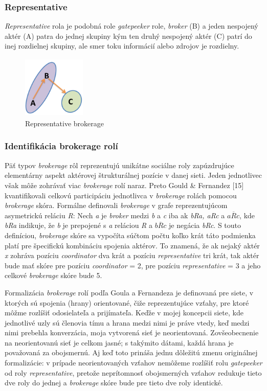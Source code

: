 \documentclass[slovak,master,public,dept460,male,cpdeclaration,oneside]{diploma}
\begin{document}
\subsubsection{Representative}
\textit{Representative} rola je podobná role \textit{gatepeeker} role, \textit{broker} (B) a jeden nespojený aktér (A) patra do jednej skupiny kým ten druhý nespojený aktér (C) patrí do inej rozdielnej skupiny, ale  smer toku informácií alebo zdrojov je rozdielny. 


\begin{figure}[H]
\centering
\includegraphics[width=3cm, height=3cm]{figures/representative}
\caption{Representative brokerage}
\end{figure}

\subsubsection{Identifikácia brokerage rolí}
Päť typov \textit{brokerage} rôl  reprezentujú unikátne sociálne roly zapúzdrujúce elementárny aspekt aktérovej štrukturálnej pozície v danej sieti. Jeden jednotlivec však môže zohrávať viac \textit{brokerage} rolí naraz. Preto Gould \& Fernandez [15] kvantifikovali celkovú participáciu jednotlivca v \textit{brokerage} rolách pomocou \textit{brokerage} skóra. Formálne definovali \textit{brokerage} v grafe reprezentujúcom asymetrickú reláciu \textit{R}: Nech \textit{a} je \textit{broker} medzi \textit{b} a \textit{c} iba ak \textit{bRa, aRc} a   ${ a\overline{R}c }$, kde \textit{bRa} indikuje, že \textit{b} je prepojené s \textit{a} reláciou \textit{R} a ${ b\overline{R}c }$
je negácia \textit{bRc}. S touto definíciou, \textit{brokerage} skóre sa vypočíta súčtom počtu koľko krát táto podmienka platí pre špecifickú kombináciu spojenia aktérov. To znamená, že ak nejaký aktér \textit{x} zohráva pozíciu \textit{coordinator} dva krát a pozíciu \textit{representative} tri krát, tak aktér bude mať skóre pre pozíciu \textit{coordinator} = 2, pre pozíciu  \textit{representative} = 3 a jeho celkové \textit{brokerage} skóre bude 5.


Formalizácia \textit{brokerage} rolí podľa Goula a Fernandeza je definovaná pre siete, v ktorých sú spojenia (hrany) orientované, čiže reprezentujúce vzťahy, pre ktoré môžme rozlíšiť odosielateľa a prijímateľa. Keďže v mojej koncepcii siete, kde jednotlivé uzly sú členovia tímu a hrana medzi nimi je práve vtedy, keď medzi nimi prebehla konverzácia, moja vytvorená sieť je neorientovaná. Zovšeobecnenie na neorientovanú sieť je celkom jasné; s takýmito dátami, každá hrana je považovaná za obojsmernú. Aj keď toto prináša jednu dôležitú zmenu originálnej formalizácie: v prípade neorientovaných vzťahov nemôžeme rozlíšiť rolu \textit{gatepeeker} od roly \textit{representative}, pretože neprítomnosť obojsmerných vzťahov redukuje tieto dve roly do jednej a \textit{brokerage} skóre bude pre tieto dve roly identické. \cite{19}
\end{document}
